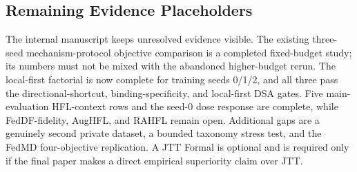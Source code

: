 \subsection{Remaining Evidence Placeholders}

The internal manuscript keeps unresolved evidence visible. The existing three-seed mechanism-protocol objective comparison is a completed fixed-budget study; its numbers must not be mixed with the abandoned higher-budget rerun. The local-first factorial is now complete for training seeds 0/1/2, and all three pass the directional-shortcut, binding-specificity, and local-first DSA gates. Five main-evaluation HFL-context rows and the seed-0 dose response are complete, while FedDF-fidelity, AugHFL, and RAHFL remain open. Additional gaps are a genuinely second private dataset, a bounded taxonomy stress test, and the FedMD four-objective replication. A JTT Formal is optional and is required only if the final paper makes a direct empirical superiority claim over JTT.

